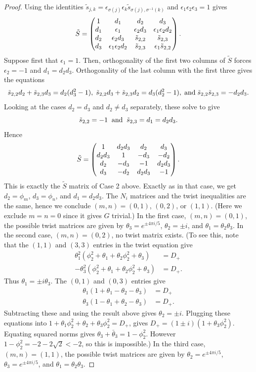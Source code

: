 \documentclass[12pt,psamsfonts]{amsart}
\newcommand{\e}{{\epsilon}}
\numberwithin{equation}{section}
\theoremstyle{definition}
\begin{document}
\begin{proof}
Using the identities $\tilde s_{j,k}=\e_{\sigma(j)}\e_k \tilde
s_{\sigma(j),\sigma^{-1}(k)}$ and $\e_1\e_2\e_3=1$ gives
$$\tilde S=\left(\begin{matrix} 1 & d_1 & d_2 & d_3\cr d_1 & \e_1 & \e_2
d_3 & \e_1\e_2 d_2\cr d_2 & \e_2 d_3 & \tilde s_{2,2} & \tilde
s_{2,3}\cr d_3 &  \e_1\e_2 d_2 & \tilde s_{2,3} & \e_1 \tilde
s_{2,2}\end{matrix} \right).$$ Suppose first that $\e_1=1$. Then,
orthogonality of the first two columns of $\tilde S$ forces
$\e_2=-1$ and $d_1=d_2 d_3$. Orthogonality of the last column with
the first three gives the equations
$$\tilde s_{2,2} d_2 + \tilde s_{2,3} d_3 = d_2 (d_3^2-1),\;
\tilde s_{2,2} d_3 + \tilde s_{2,3} d_2 = d_3 (d_2^2-1),\; {\rm
and}\; \tilde s_{2,2} \tilde s_{2,3}=-d_2d_3.$$ Looking at the
cases $d_2=d_3$ and $d_2\ne d_3$ separately, these solve to give
$$\tilde s_{2,2} = -1\;\; {\rm and }\;\; \tilde s_{2,3} = d_1=d_2 d_3.$$
Hence
$$\tilde S=\left(\begin{matrix} 1 & d_2 d_3 & d_2 & d_3\cr d_2 d_3 & 1 &
-d_3 & -d_2\cr d_2 & -d_3 & -1 & d_2 d_3\cr d_3 & -d_2 & d_2 d_3 &
-1\end{matrix}\right).$$ This is exactly the $\tilde S$ matrix of
Case 2 above. Exactly as in that case, we get $d_2=\phi_m$,
$d_3=\phi_n$, and $d_1=d_2d_3$. The $N_i$ matrices and the twist
inequalities are the same, hence we conclude $(m,n)=(0,1)$,
$(0,2)$, or $(1,1)$. (Here we exclude $m=n=0$ since it gives $G$
trivial.) In the first case, $(m,n)=(0,1)$, the possible twist
matrices are given by $\theta_3=e^{\pm 4\pi i/5}$, $\theta_2=\pm
i$, and $\theta_1=\theta_2\theta_3$. In the second case,
$(m,n)=(0,2)$, no twist matrix exists. (To see this, note that the
$(1,1)$ and $(3,3)$ entries in the twist equation give
\begin{equation*}\begin{split}
\theta_1^2(\phi_2^2+\theta_1 + \theta_2 \phi_2^2 +\theta_3 ) & = D_+\\
-\theta_3^2(\phi_2^2+\theta_1 + \theta_2 \phi_2^2 +\theta_3 ) & =
D_+.
\end{split}\end{equation*}
Thus $\theta_1=\pm i \theta_3$. The $(0,1)$ and $(0,3)$ entries
give
\begin{equation*}\begin{split}
\theta_1(1+\theta_1 - \theta_2 -\theta_3 ) & = D_+\\
\theta_3(1-\theta_1 + \theta_2 -\theta_3 ) & = D_+.
\end{split}\end{equation*}
Subtracting these and using the result above gives $\theta_2=\pm
i$. Plugging these equations into $1+\theta_1\phi_2^2 +\theta_2 +
\theta_3\phi_2^2=D_+$, gives $D_+=(1\pm i)(1+\theta_3\phi_2^2)$.
Equating squared norms gives $\theta_3+\bar \theta_3 =
1-\phi_2^2$. However $1-\phi_2^2=-2-2{\sqrt 2}<-2$, so this is
impossible.) In the third case, $(m,n)=(1,1)$, the possible twist
matrices are given by $\theta_2=e^{\pm 4\pi i/5}$,
$\theta_3=e^{\pm 4\pi i/5}$, and $\theta_1=\theta_2\theta_3$.


\end{proof}
\end{document}
